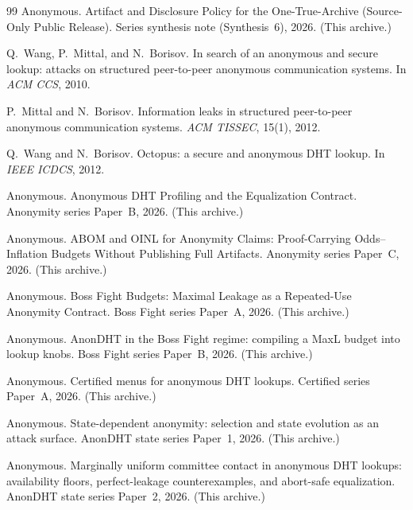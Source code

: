 \documentclass[11pt]{article}
\begin{document}
\begin{thebibliography}{99}\small
{}
Anonymous.
\newblock Artifact and Disclosure Policy for the One-True-Archive (Source-Only Public Release).
\newblock Series synthesis note (Synthesis~6), 2026. (This archive.)

Q.~Wang, P.~Mittal, and N.~Borisov.
\newblock In search of an anonymous and secure lookup: attacks on structured peer-to-peer anonymous communication systems.
\newblock In \emph{ACM CCS}, 2010.

P.~Mittal and N.~Borisov.
\newblock Information leaks in structured peer-to-peer anonymous communication systems.
\newblock \emph{ACM TISSEC}, 15(1), 2012.

Q.~Wang and N.~Borisov.
\newblock Octopus: a secure and anonymous DHT lookup.
\newblock In \emph{IEEE ICDCS}, 2012.

Anonymous.
\newblock Anonymous DHT Profiling and the Equalization Contract.
\newblock Anonymity series Paper~B, 2026. (This archive.)

Anonymous.
\newblock ABOM and OINL for Anonymity Claims: Proof-Carrying Odds--Inflation Budgets Without Publishing Full Artifacts.
\newblock Anonymity series Paper~C, 2026. (This archive.)

Anonymous.
\newblock Boss Fight Budgets: Maximal Leakage as a Repeated-Use Anonymity Contract.
\newblock Boss Fight series Paper~A, 2026. (This archive.)

Anonymous.
\newblock AnonDHT in the Boss Fight regime: compiling a MaxL budget into lookup knobs.
\newblock Boss Fight series Paper~B, 2026. (This archive.)

Anonymous.
\newblock Certified menus for anonymous DHT lookups.
\newblock Certified series Paper~A, 2026. (This archive.)

Anonymous.
\newblock State-dependent anonymity: selection and state evolution as an attack surface.
\newblock AnonDHT state series Paper~1, 2026. (This archive.)

Anonymous.
\newblock Marginally uniform committee contact in anonymous DHT lookups: availability floors, perfect-leakage counterexamples, and abort-safe equalization.
\newblock AnonDHT state series Paper~2, 2026. (This archive.)


\end{thebibliography}
\end{document}
